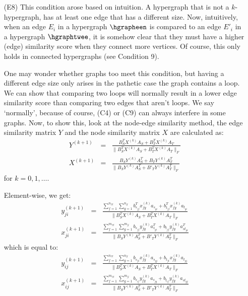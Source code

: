 \documentclass[a4paper,11pt]{report}
\newcommand{\graf}{\mathscr{G}}
\newcommand{\grafeen}{\mathscr{H}}
\begin{document}
\begin{itemize}
\begin{proof}
    so $v_u$ has the same entries in the adjacency matrix as $v_t$, which is an alternative way to say that
    $v_u$ is interchangeable with $v_t$. The theorem now follows. 
    
\end{proof}     
 
  \item[(E8)] This condition arose based on intuition. A hypergraph that is not a $k$-hypergraph,
  has at least one edge that has a different size. Now, intuitively, when an edge 
   $E_i$ in a hypergraph $\hgrapheen$ is compared to an edge $E'_i$ in a hypergraph 
  $\hgraphtwee$, it is somehow clear that they must have a higher (edge) similarity score 
  when they connect more vertices. Of course,
  this only holds in connected hypergraphs (see Condition 9).  
  
One may wonder whether graphs too meet this condition, but having a different edge size only 
arises in the pathetic case the graph contains a loop. We can show that comparing two loops will normally result
in a lower edge similarity score than comparing two edges that aren't loops. We say `normally', because of course, (C4) or (C9) can always
interfere in some graphs. Now, to show this, look at the 
node-edge similarity method, the edge similarity matrix $Y$ and the node 
similarity matrix $X$ are calculated as:
\begin{eqnarray}
  Y^{(k+1)} &=& \frac{B_S^TX^{(k)}A_S + B_T^TX^{(k)}A_T}{\|B_S^TX^{(k)}A_S + 
  B_T^TX^{(k)}A_T\|_F}\\
   X^{(k+1)} &=& \frac{B_SY^{(k)}A_S^T + B_TY^{(k)}A^T_T}{\|B_SY^{(k)}A_S^T + 
   B'_TY^{(k)}A^T_T\|_F} \end{eqnarray}
  for  $k =  0,1,\ldots$.
  
 Element-wise, we get:
  \begin{eqnarray*}
  y^{(k+1)}_{ji} &=& \frac{\sum^{n_\grafeen}_{f=1}\sum^{n_\graf}_{g=1} b_{s_{jf}}^Tx_{fg}^{(k)}a_{s_{gi}} + b_{t_{jf}}^Tx_{fg}^{(k)}a_{t_{gi}}}{\|B_S^TX^{(k)}A_S + 
  B_T^TX^{(k)}A_T\|_F}\\
   x^{(k+1)}_{ji} &=& \frac{\sum^{m_\grafeen}_{f=1}\sum^{m_\graf}_{g=1} b_{s_{jf}}y_{fg}^{(k)}a_{s_{gi}}^T + b_{t_{jf}}y_{fg}^{(k)}a_{st_{gi}}^T}{\|B_SY^{(k)}A_S^T + 
   B'_TY^{(k)}A^T_T\|_F}
 \end{eqnarray*}
 which is equal to:
  \begin{eqnarray*}
  y^{(k+1)}_{ij} &=& \frac{\sum^{n_\grafeen}_{f=1}\sum^{n_\graf}_{g=1} b_{s_{fi}}x_{fg}^{(k)}a_{s_{gj}} + b_{t_{fi}}x_{fg}^{(k)}a_{t_{gj}}}{\|B_S^TX^{(k)}A_S + 
  B_T^TX^{(k)}A_T\|_F}\\
   x^{(k+1)}_{ij} &=& \frac{\sum^{m_\grafeen}_{f=1}\sum^{m_\graf}_{g=1} b_{s_{if}}y_{fg}^{(k)}a_{s_{jg}} + b_{t_{if}}y_{fg}^{(k)}a_{st_{gj}}}{\|B_SY^{(k)}A_S^T + 
   B'_TY^{(k)}A^T_T\|_F}
 \end{eqnarray*}
  

\end{itemize}
\end{document}

